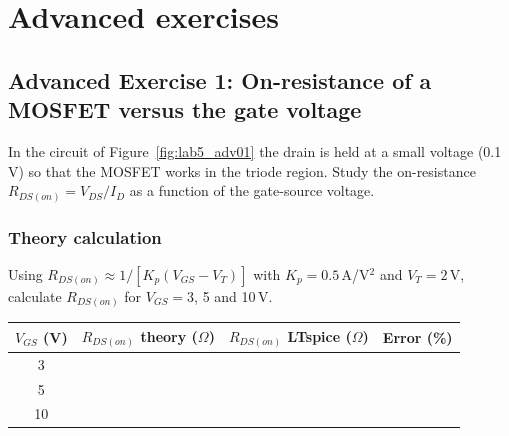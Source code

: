 

\newpage
\section{Advanced exercises}

\subsection{Advanced Exercise 1: On-resistance of a MOSFET versus the gate voltage}
In the circuit of Figure~\ref{fig:lab5_adv01} the drain is held at a small voltage (0.1\,V) so that the MOSFET works in the triode region. Study the on-resistance $R_{DS(on)}=V_{DS}/I_D$ as a function of the gate-source voltage.


\subsubsection{Theory calculation}\vspace{-3pt}\notesblock Using $R_{DS(on)}\approx1/[K_p(V_{GS}-V_T)]$ with $K_p=0.5$\,A/V$^2$ and $V_T=2$\,V, calculate $R_{DS(on)}$ for $V_{GS}=3$, 5 and 10\,V.

\begin{center}\renewcommand{\arraystretch}{1.8}\begin{tabular}{|c|c|c|c|}\hline \textbf{$V_{GS}$ (V)} & \textbf{$R_{DS(on)}$ theory ($\Omega$)} & \textbf{$R_{DS(on)}$ LTspice ($\Omega$)} & \textbf{Error (\%)}\\ \hline 3 & & & \\ \hline 5 & & & \\ \hline 10 & & & \\ \hline \end{tabular}\end{center}
\newpage

